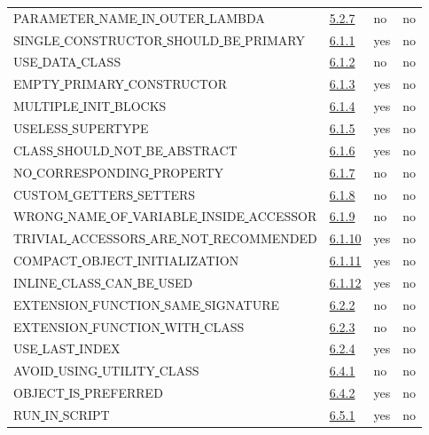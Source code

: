 \begin{longtable}{ |l|p{0.8cm}|p{0.8cm}| p{3cm} | }
PARAMETER\underline{ }NAME\underline{ }IN\underline{ }OUTER\underline{ }LAMBDA & \hyperref[sec:5.2.7]{5.2.7} &  no  &  no\\
SINGLE\underline{ }CONSTRUCTOR\underline{ }SHOULD\underline{ }BE\underline{ }PRIMARY & \hyperref[sec:6.1.1]{6.1.1} &  yes  &   no  \\
USE\underline{ }DATA\underline{ }CLASS & \hyperref[sec:6.1.2]{6.1.2} &  no  &   no  \\
EMPTY\underline{ }PRIMARY\underline{ }CONSTRUCTOR & \hyperref[sec:6.1.3]{6.1.3} &  yes  &   no  \\
MULTIPLE\underline{ }INIT\underline{ }BLOCKS & \hyperref[sec:6.1.4]{6.1.4} &  yes  &   no  \\
USELESS\underline{ }SUPERTYPE & \hyperref[sec:6.1.5]{6.1.5} &  yes  &   no  \\
CLASS\underline{ }SHOULD\underline{ }NOT\underline{ }BE\underline{ }ABSTRACT & \hyperref[sec:6.1.6]{6.1.6} &  yes  &   no  \\
NO\underline{ }CORRESPONDING\underline{ }PROPERTY & \hyperref[sec:6.1.7]{6.1.7} &  no  &   no  \\
CUSTOM\underline{ }GETTERS\underline{ }SETTERS & \hyperref[sec:6.1.8]{6.1.8} &  no  &   no  \\
WRONG\underline{ }NAME\underline{ }OF\underline{ }VARIABLE\underline{ }INSIDE\underline{ }ACCESSOR & \hyperref[sec:6.1.9]{6.1.9} &  no  &  no                                                                                                                                                                                                                         \\
TRIVIAL\underline{ }ACCESSORS\underline{ }ARE\underline{ }NOT\underline{ }RECOMMENDED & \hyperref[sec:6.1.10]{6.1.10} &  yes  &   no  \\
COMPACT\underline{ }OBJECT\underline{ }INITIALIZATION & \hyperref[sec:6.1.11]{6.1.11} &  yes  &   no  \\
INLINE\underline{ }CLASS\underline{ }CAN\underline{ }BE\underline{ }USED & \hyperref[sec:6.1.12]{6.1.12} &  yes  &  no \\
EXTENSION\underline{ }FUNCTION\underline{ }SAME\underline{ }SIGNATURE & \hyperref[sec:6.2.2]{6.2.2} &  no  &   no  \\
EXTENSION\underline{ }FUNCTION\underline{ }WITH\underline{ }CLASS & \hyperref[sec:6.2.3]{6.2.3} &  no  &  no \\
USE\underline{ }LAST\underline{ }INDEX & \hyperref[sec:6.2.4]{6.2.4} &  yes  &  no                                                                                                                                                                                                                         \\
AVOID\underline{ }USING\underline{ }UTILITY\underline{ }CLASS & \hyperref[sec:6.4.1]{6.4.1} &  no  &  no \\
OBJECT\underline{ }IS\underline{ }PREFERRED & \hyperref[sec:6.4.2]{6.4.2} &  yes  &  no \\
RUN\underline{ }IN\underline{ }SCRIPT & \hyperref[sec:6.5.1]{6.5.1} &  yes  &  no \\
\hline
\end{longtable}
